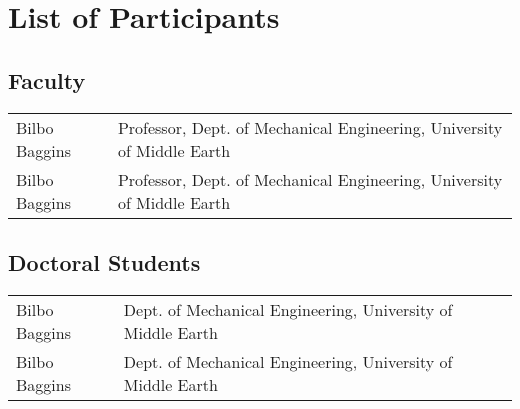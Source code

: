 \section{List of Participants}
\subsection*{Faculty}
\begin{tabular}{ll}
Bilbo Baggins & Professor, Dept. of Mechanical Engineering, University of Middle Earth \\
Bilbo Baggins & Professor, Dept. of Mechanical Engineering, University of Middle Earth 
\end{tabular}

\subsection*{Doctoral Students}
\begin{tabular}{ll}
Bilbo Baggins &  Dept. of Mechanical Engineering, University of Middle Earth \\
Bilbo Baggins &   Dept. of Mechanical Engineering, University of Middle Earth 
\end{tabular}


